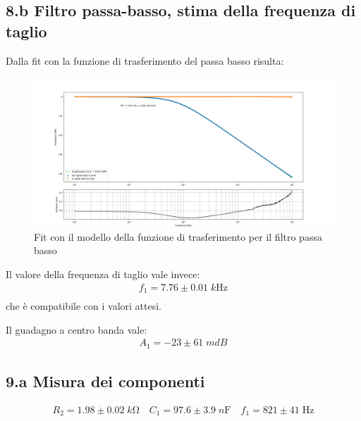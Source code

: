 \documentclass[10pt,a4paper]{article}
\begin{document}
\subsection*{8.b Filtro passa-basso, stima della frequenza di taglio}
Dalla fit con la funzione di trasferimento del passa basso risulta:
\begin{figure}[H]
\centering
\includegraphics[scale=0.4]{passa_basso}
\caption{Fit con il modello della funzione di trasferimento per il filtro passa basso}
\end{figure}
Il valore della frequenza di taglio vale invece:
\begin{align*}
f_1 = 7.76 \pm 0.01 \; \si{k\Hz}\\
\end{align*}
che è compatibile con i valori attesi.

Il guadagno a centro banda vale:
\begin{align*}
A_1 = -23 \pm 61 \; \si{mdB}
\end{align*}

\subsection*{9.a Misura dei componenti}
\begin{align*}
R_2 = 1.98 \pm 0.02 \; \si{k\ohm} \quad C_1 = 97.6 \pm 3.9 \; \si{n\F} \quad
f_1 = 821 \pm 41 \; \si{\Hz}
\end{align*}
\end{document}
